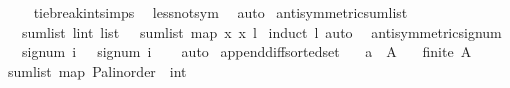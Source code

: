 \begin{isabellebody}
%
\isadelimproof
\ \ %
\endisadelimproof
%
\isatagproof
{}\isamarkupfalse%
\ \ tie{\isacharunderscore}{\kern0pt}break{\isacharunderscore}{\kern0pt}int{\isachardot}{\kern0pt}simps\ \isamarkupfalse%
\ less{\isacharunderscore}{\kern0pt}not{\isacharunderscore}{\kern0pt}sym\ \isamarkupfalse%
\ auto%
\endisatagproof
{\isafoldproof}%
%
\isadelimproof
\isanewline
%
\endisadelimproof
\isanewline
\isanewline
{}\isamarkupfalse%
\ antisymmetric{\isacharunderscore}{\kern0pt}sumlist{\isacharcolon}{\kern0pt}\isanewline
\ \ \ {\isachardoublequoteopen}sum{\isacharunderscore}{\kern0pt}list\ {\isacharparenleft}{\kern0pt}l{\isacharcolon}{\kern0pt}{\isacharcolon}{\kern0pt}int\ list{\isacharparenright}{\kern0pt}\ {\isacharequal}{\kern0pt}\ {\isacharminus}{\kern0pt}\ sum{\isacharunderscore}{\kern0pt}list\ {\isacharparenleft}{\kern0pt}map\ {\isacharparenleft}{\kern0pt}{\isasymlambda}x{\isachardot}{\kern0pt}\ {\isacharminus}{\kern0pt}x{\isacharparenright}{\kern0pt}\ l{\isacharparenright}{\kern0pt}\ {\isachardoublequoteclose}\isanewline
%
\isadelimproof
%
\endisadelimproof
%
\isatagproof
{}\isamarkupfalse%
{\isacharparenleft}{\kern0pt}induct\ l{\isacharcomma}{\kern0pt}\ auto{\isacharparenright}{\kern0pt}\ \isamarkupfalse%
%
\endisatagproof
{\isafoldproof}%
%
\isadelimproof
\isanewline
%
\endisadelimproof
\isanewline
\isanewline
{}\isamarkupfalse%
\ antisymmetric{\isacharunderscore}{\kern0pt}signum{\isacharcolon}{\kern0pt}\isanewline
\ \ \ {\isachardoublequoteopen}signum\ i\ {\isacharequal}{\kern0pt}\ {\isacharminus}{\kern0pt}\ {\isacharparenleft}{\kern0pt}signum\ {\isacharparenleft}{\kern0pt}{\isacharminus}{\kern0pt}i{\isacharparenright}{\kern0pt}{\isacharparenright}{\kern0pt}{\isachardoublequoteclose}\isanewline
%
\isadelimproof
\ \ %
\endisadelimproof
%
\isatagproof
{}\isamarkupfalse%
\ auto%
\endisatagproof
{\isafoldproof}%
%
\isadelimproof
\isanewline
%
\endisadelimproof
\isanewline
\isanewline
\isanewline
{}\isamarkupfalse%
\ append{\isacharunderscore}{\kern0pt}diff{\isacharunderscore}{\kern0pt}sorted{\isacharunderscore}{\kern0pt}set{\isacharcolon}{\kern0pt}\isanewline
\ \ \ {\isachardoublequoteopen}a\ {\isasymin}\ A{\isachardoublequoteclose}\isanewline
\ \ \ {\isachardoublequoteopen}finite\ A{\isachardoublequoteclose}\isanewline
{}\ {\isachardoublequoteopen}sum{\isacharunderscore}{\kern0pt}list\ {\isacharparenleft}{\kern0pt}{\isacharparenleft}{\kern0pt}map\ {\isacharparenleft}{\kern0pt}P{\isacharcolon}{\kern0pt}{\isacharcolon}{\kern0pt}{\isacharparenleft}{\kern0pt}{\isacharprime}{\kern0pt}a{\isacharcolon}{\kern0pt}{\isacharcolon}{\kern0pt}linorder\ {\isasymRightarrow}\ int{\isacharparenright}{\kern0pt}{\isacharparenright}{\kern0pt}{\isacharparenright}{\kern0pt}\isanewline

\end{isabellebody}
